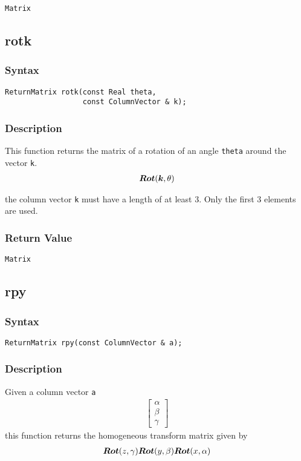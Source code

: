 \documentclass[dvips,11pt,fleqn]{report}
\newcommand{\mbold}[1]{\mbox{\boldmath $ #1 $}}
\newcommand{\matr}[2]{\left[\begin{array}{#1} #2 \end{array}\right]}
\begin{document}
{\tt Matrix}

\newpage

\subsection*{rotk}

\subsubsection*{Syntax}
\begin{verbatim}
ReturnMatrix rotk(const Real theta, 
                  const ColumnVector & k);
\end{verbatim}
\subsubsection*{Description}
This function returns the matrix of a rotation of an angle {\tt theta} around 
the vector {\tt k}.
\begin{eqnarray}
\mbold{Rot}(\mbold{k}, \theta)
\end{eqnarray}

 the column vector {\tt k} must have a length of at least 3. 
Only the first 3 elements are used.

\subsubsection*{Return Value}

{\tt Matrix}

\newpage

\subsection*{rpy}
\subsubsection*{Syntax}
\begin{verbatim}
ReturnMatrix rpy(const ColumnVector & a);
\end{verbatim}
\subsubsection*{Description}
Given a column vector {\tt a} 
\begin{eqnarray}
\matr{c}{\alpha \\ \beta \\ \gamma}
\end{eqnarray}
this function returns the homogeneous transform matrix given by 
\begin{eqnarray}
\mbold{Rot}(z,\gamma) \mbold{Rot}(y,\beta) \mbold{Rot}(x,\alpha)
\end{eqnarray}
\end{document}
